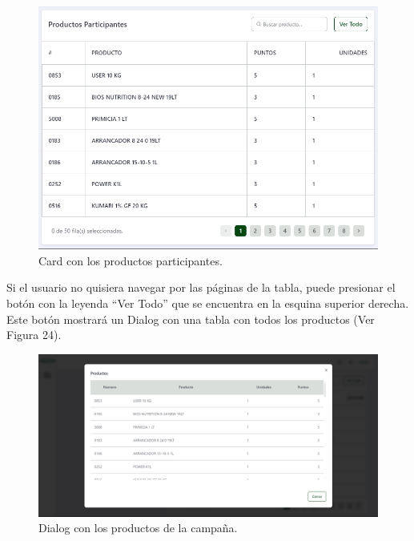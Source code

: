     \begin{figure}[H]
        \begin{center}
            \includegraphics[scale=0.40]{img/actividades/detalles-campanias/card-productos-participantes.png}
            \caption{Card con los productos participantes.}
            \label{fig:card-productos-participantes}
        \end{center}
    \end{figure}

Si el usuario no quisiera navegar por las páginas de la tabla, puede presionar el botón con la leyenda ``Ver Todo'' que se encuentra en la esquina superior derecha. Este botón mostrará un Dialog con una tabla con todos los productos (Ver Figura 24).

    \begin{figure}[H]
        \begin{center}
            \includegraphics[scale=0.35]{img/actividades/detalles-campanias/dialog-productos-participantes.png}
            \caption{Dialog con los productos de la campaña.}
            \label{fig:dialog-productos-participantes}
        \end{center}
    \end{figure}


